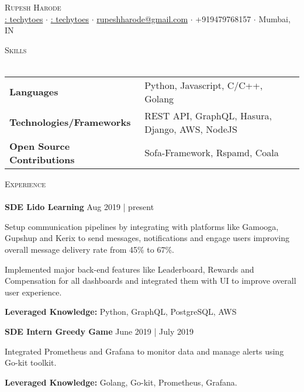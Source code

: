 \documentclass[a4paper]{article}
\newcommand{\lineunder} {
    \vspace*{-8pt} \\
    \hspace*{-18pt} \hrulefill \\
}
\newcommand{\header} [1] {
    {\hspace*{-18pt}\vspace*{6pt} \textsc{#1}}
    \vspace*{-6pt} \lineunder
}
\begin{document}
\vspace*{-40pt}

\vspace*{-10pt}
\begin{center}
	{\Huge \scshape {Rupesh Harode}}\\
	{\faLinkedin \href{https://www.linkedin.com/in/techytoes/}{: techytoes}}
	$\cdot$
	{\faGithub \href{https://github.com/techytoes}{ : techytoes}}
	$\cdot$
	\href{mailto:rupeshharode@gmail.com}{rupeshharode@gmail.com} $\cdot$ +919479768157 $\cdot$ Mumbai, IN \\
\end{center}


\header{Skills}
\begin{tabular}{ l l }
	\small{\textbf{Languages}}      & \small{Python, Javascript, C/C++, Golang}      \\
	\small{\textbf{Technologies/Frameworks}} 
	&
	 \small{REST API, GraphQL, Hasura, Django, AWS, NodeJS}
	 \\
	\small{\textbf{Open Source Contributions}}      & \small{Sofa-Framework, Rspamd, Coala}               \\
\end{tabular}
\vspace{1mm}


\header{Experience}
\textbf{SDE  \hfill Lido Learning} \hfill Aug 2019 | present\\
\vspace{-1mm}
\begin{itemize} \itemsep 1pt
	\small{\item Setup communication pipelines by integrating with platforms like Gamooga, Gupshup and Kerix to send messages, notifications and engage users improving overall message delivery rate from 45\% to 67\%.}
	\small{\item Implemented major back-end features like Leaderboard, Rewards and Compensation for all dashboards and integrated them with UI to improve overall user experience.}
	\small{\item \textbf{Leveraged Knowledge:} Python, GraphQL, PostgreSQL, AWS}
\end{itemize}

\textbf{SDE Intern  \hfill Greedy Game} \hfill June 2019 | July 2019\\
\vspace{-1mm}
\begin{itemize} \itemsep 1pt
	\small{\item Integrated Prometheus and Grafana to monitor data and manage alerts using Go-kit toolkit.}
	\small{\item \textbf{Leveraged Knowledge:} Golang, Go-kit, Prometheus, Grafana.}
\end{itemize}
\end{document}
